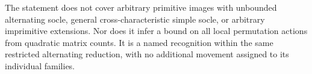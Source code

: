 \begin{remark}
The statement does not cover arbitrary primitive images
with unbounded alternating socle, general
cross-characteristic simple socle, or arbitrary
imprimitive extensions. Nor does it infer a bound on
all local permutation actions from quadratic matrix
counts. It is a named recognition within the same
restricted alternating reduction, with no additional
movement assigned to its individual families.
\end{remark}
